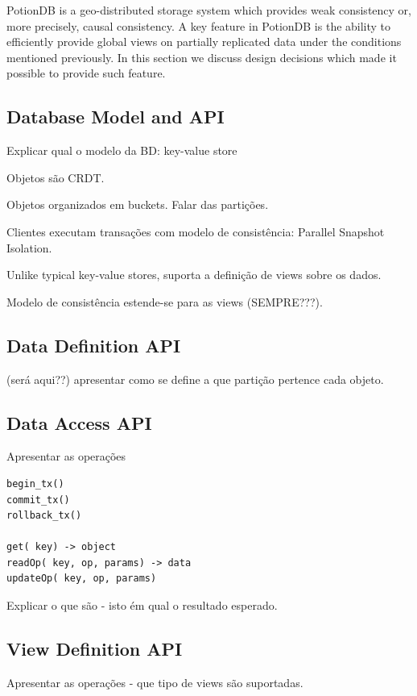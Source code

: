 \documentclass{vldb}
\begin{document}
PotionDB is a geo-distributed storage system which provides weak consistency or, more precisely, causal consistency.
A key feature in PotionDB is the ability to efficiently provide global views on partially replicated data under the conditions mentioned previously.
In this section we discuss design decisions which made it possible to provide such feature.

\subsection{Database Model and API} 

Explicar qual o modelo da BD: key-value store

Objetos são CRDT.

Objetos organizados em buckets. Falar das partições.

Clientes executam transações com modelo de consistência: Parallel Snapshot Isolation.

Unlike typical key-value stores, suporta a definição de views sobre os dados.

Modelo de consistência estende-se para as views (SEMPRE???).

\subsection{Data Definition API}

(será aqui??)
apresentar como se define a que partição pertence cada objeto.


\subsection{Data Access API}

Apresentar as operações 

\begin{verbatim}
begin_tx()
commit_tx()
rollback_tx()

get( key) -> object
readOp( key, op, params) -> data
updateOp( key, op, params)
\end{verbatim}

Explicar o que são - isto ém qual o resultado esperado.


\subsection{View Definition API}

Apresentar as operações - que tipo de views são suportadas.
\end{document}
